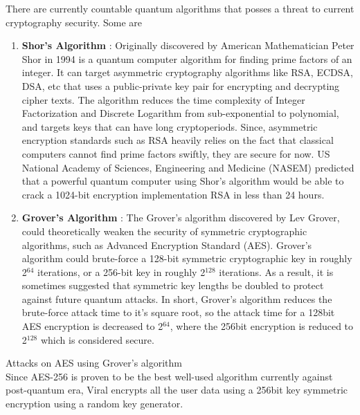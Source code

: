 \documentclass[10pt]{article}
\begin{document}
There are currently countable quantum algorithms that posses a threat to current cryptography security. Some are
\begin{enumerate}[leftmargin=+0.2in]
\item \textbf{Shor's Algorithm} : Originally discovered by American Mathematician Peter Shor in 1994 is a quantum computer algorithm for finding prime factors of an integer. It can target asymmetric cryptography algorithms like RSA, ECDSA, DSA, etc that uses a public-private key pair for encrypting and decrypting cipher texts. The algorithm reduces the time complexity of Integer Factorization and Discrete Logarithm from sub-exponential to polynomial, and targets keys that can have long cryptoperiods. Since, asymmetric encryption standards such as RSA heavily relies on the fact that classical computers cannot find prime factors swiftly, they are secure for now. US National Academy of Sciences, Engineering and Medicine (NASEM) predicted that a powerful quantum computer using Shor’s algorithm would be able to crack a 1024-bit encryption implementation RSA in less than 24 hours.
\item \textbf{Grover's Algorithm} : The Grover's algorithm discovered by Lev Grover, could theoretically weaken the security of symmetric cryptographic algorithms, such as Advanced Encryption Standard (AES). Grover's algorithm could brute-force a 128-bit symmetric cryptographic key in roughly 2$^{64}$ iterations, or a 256-bit key in roughly 2$^{128}$ iterations. As a result, it is sometimes suggested that symmetric key lengths be doubled to protect against future quantum attacks.  In short, Grover's algorithm reduces the brute-force attack time to it's square root, so the attack time for a 128bit AES encryption is decreased to 2$^{64}$, where the 256bit encryption is reduced to 2$^{128}$ which is considered secure.
\end{enumerate}

Attacks on AES using Grover's algorithm\\

Since AES-256 is proven to be the best well-used algorithm currently against post-quantum era, Viral encrypts all the user data using a 256bit key symmetric encryption using a random key generator. \\
\end{document}
